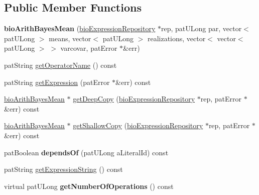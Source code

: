 \subsection*{Public Member Functions}
\begin{DoxyCompactItemize}
\item 
\mbox{\label{classbio_arith_bayes_mean_a5e958254c919ea1a181540bea2c64736}} 
{\bfseries bio\+Arith\+Bayes\+Mean} (\hyperlink{classbio_expression_repository}{bio\+Expression\+Repository} $\ast$rep, pat\+U\+Long par, vector$<$ pat\+U\+Long $>$ means, vector$<$ pat\+U\+Long $>$ realizations, vector$<$ vector$<$ pat\+U\+Long $>$ $>$ varcovar, pat\+Error $\ast$\&err)
\item 
pat\+String \hyperlink{classbio_arith_bayes_mean_a681e8636e50c05683a0d89170a264ac9}{get\+Operator\+Name} () const
\item 
pat\+String \hyperlink{classbio_arith_bayes_mean_a334b29ea459dc9f8943f888595dc4aa5}{get\+Expression} (pat\+Error $\ast$\&err) const
\item 
\hyperlink{classbio_arith_bayes_mean}{bio\+Arith\+Bayes\+Mean} $\ast$ \hyperlink{classbio_arith_bayes_mean_ac37c22c5d01ae43834f930a39bca5039}{get\+Deep\+Copy} (\hyperlink{classbio_expression_repository}{bio\+Expression\+Repository} $\ast$rep, pat\+Error $\ast$\&err) const
\item 
\hyperlink{classbio_arith_bayes_mean}{bio\+Arith\+Bayes\+Mean} $\ast$ \hyperlink{classbio_arith_bayes_mean_a1cee3c48858490ec488b2754c32c56f2}{get\+Shallow\+Copy} (\hyperlink{classbio_expression_repository}{bio\+Expression\+Repository} $\ast$rep, pat\+Error $\ast$\&err) const
\item 
\mbox{\label{classbio_arith_bayes_mean_a7c85429c6fb48fe19b5731d200f7e748}} 
pat\+Boolean {\bfseries depends\+Of} (pat\+U\+Long a\+Literal\+Id) const
\item 
pat\+String \hyperlink{classbio_arith_bayes_mean_a240a65d98274bae45da8203db5a96754}{get\+Expression\+String} () const
\item 
\mbox{\label{classbio_arith_bayes_mean_ad90697c64d51c7afdafb3dd30cac9980}} 
virtual pat\+U\+Long {\bfseries get\+Number\+Of\+Operations} () const
\item 
\mbox{\label{classbio_arith_bayes_mean_a8f14b45d74d6860988db43f2393a80de}} 

\end{DoxyCompactItemize}
